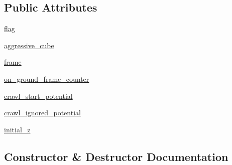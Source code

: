 \subsection*{Public Attributes}
\begin{DoxyCompactItemize}
\item 
\hyperlink{classpybullet-gym_1_1pybulletgym_1_1envs_1_1roboschool_1_1robots_1_1locomotors_1_1humanoid__flagrun_1_1_humanoid_flagrun_harder_ae4abde549d385a9b997b997424f6a8be}{flag}
\item 
\hyperlink{classpybullet-gym_1_1pybulletgym_1_1envs_1_1roboschool_1_1robots_1_1locomotors_1_1humanoid__flagrun_1_1_humanoid_flagrun_harder_ab9a288c42939cf93d9b54fab836d2f30}{aggressive\+\_\+cube}
\item 
\hyperlink{classpybullet-gym_1_1pybulletgym_1_1envs_1_1roboschool_1_1robots_1_1locomotors_1_1humanoid__flagrun_1_1_humanoid_flagrun_harder_ab76457290f841f5252004ba61ce0e037}{frame}
\item 
\hyperlink{classpybullet-gym_1_1pybulletgym_1_1envs_1_1roboschool_1_1robots_1_1locomotors_1_1humanoid__flagrun_1_1_humanoid_flagrun_harder_a3319b58eeb6aa0b06efe565afbe52d34}{on\+\_\+ground\+\_\+frame\+\_\+counter}
\item 
\hyperlink{classpybullet-gym_1_1pybulletgym_1_1envs_1_1roboschool_1_1robots_1_1locomotors_1_1humanoid__flagrun_1_1_humanoid_flagrun_harder_a9d3ffe84fec419f63e832904b29e3f18}{crawl\+\_\+start\+\_\+potential}
\item 
\hyperlink{classpybullet-gym_1_1pybulletgym_1_1envs_1_1roboschool_1_1robots_1_1locomotors_1_1humanoid__flagrun_1_1_humanoid_flagrun_harder_a7e151da2c4448cf90aa8d6bfde8b014c}{crawl\+\_\+ignored\+\_\+potential}
\item 
\hyperlink{classpybullet-gym_1_1pybulletgym_1_1envs_1_1roboschool_1_1robots_1_1locomotors_1_1humanoid__flagrun_1_1_humanoid_flagrun_harder_ad4eed86a2657bb9053cae2adcf497d6c}{initial\+\_\+z}
\end{DoxyCompactItemize}


\subsection{Constructor \& Destructor Documentation}
